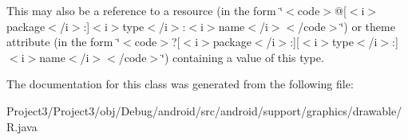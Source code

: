 This may also be a reference to a resource (in the form \char`\"{}$<$code$>$@\mbox{[}$<$i$>$package$<$/i$>$\+:\mbox{]}$<$i$>$type$<$/i$>$\+:$<$i$>$name$<$/i$>$$<$/code$>$\char`\"{}) or theme attribute (in the form \char`\"{}$<$code$>$?\mbox{[}$<$i$>$package$<$/i$>$\+:\mbox{]}\mbox{[}$<$i$>$type$<$/i$>$\+:\mbox{]}$<$i$>$name$<$/i$>$$<$/code$>$\char`\"{}) containing a value of this type. 

The documentation for this class was generated from the following file\+:\begin{DoxyCompactItemize}
\item 
Project3/\+Project3/obj/\+Debug/android/src/android/support/graphics/drawable/R.\+java\end{DoxyCompactItemize}

